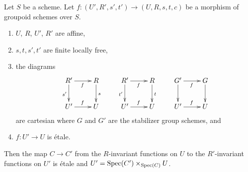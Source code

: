 \begin{lemma}
\label{lemma-etale}
Let $S$ be a scheme. Let $f : (U', R', s', t') \to (U, R, s, t, c)$ be a
morphism of groupoid schemes over $S$.
\begin{enumerate}
\item $U$, $R$, $U'$, $R'$ are affine,
\item $s, t, s', t'$ are finite locally free,
\item the diagrams
$$
\xymatrix{
R' \ar[d]_{s'} \ar[r]_f & R \ar[d]^s \\
U' \ar[r]^f & U
}
\quad
\quad
\xymatrix{
R' \ar[d]_{t'} \ar[r]_f & R \ar[d]^t \\
U' \ar[r]^f & U
}
\quad
\quad
\xymatrix{
G' \ar[d] \ar[r]_f & G \ar[d] \\
U' \ar[r]^f & U
}
$$
are cartesian where $G$ and $G'$ are the stabilizer group schemes, and
\item $f : U' \to U$ is \'etale.
\end{enumerate}
Then the map $C \to C'$ from the $R$-invariant functions on $U$
to the $R'$-invariant functions on $U'$ is \'etale and
$U' = \mathop{\mathrm{Spec}}(C') \times_{\mathop{\mathrm{Spec}}(C)} U$.
\end{lemma}

